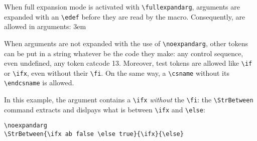 \documentclass[english,a4paper,10pt]{article}
\newcommand\styleexercice{\footnotesize}
\newcommand\verbinline{\lstinline[basicstyle=\normalsize\ttfamily]}
\begin{document}
When full expansion mode is activated with \verbinline|\fullexpandarg|, arguments are expanded with an \verbinline|\edef| before they are read by the macro. Consequently, are allowed in arguments:
\parindent3em
\parindent0pt
\smallskip

When arguments are not expanded with the use of \verbinline|\noexpandarg|, other tokens can be put in a string whatever be the code they make: any control sequence, even undefined, any token catcode 13. Moreover, test tokens are allowed like \verbinline|\if| or \verbinline|\ifx|, even without their \verbinline|\fi|. On the same way, a \verbinline|\csname| without its \verbinline|\endcsname| is allowed.

In this example, the argument contains a \verbinline|\ifx| \emph{without} the \verbinline|\fi|: the \verbinline|\StrBetween| command extracts and dislpays what is between \verbinline|\ifx| and \verbinline|\else|:\par\medskip\nobreak

\begin{minipage}[c]{0.65\linewidth}
\begin{lstlisting}
\noexpandarg
\StrBetween{\ifx ab false \else true}{\ifx}{\else}
\end{lstlisting}%
\end{minipage}\hfill
\begin{minipage}[c]{0.35\linewidth}
	\styleexercice
	\noexpandarg
\end{minipage}
\medskip
\end{document}

